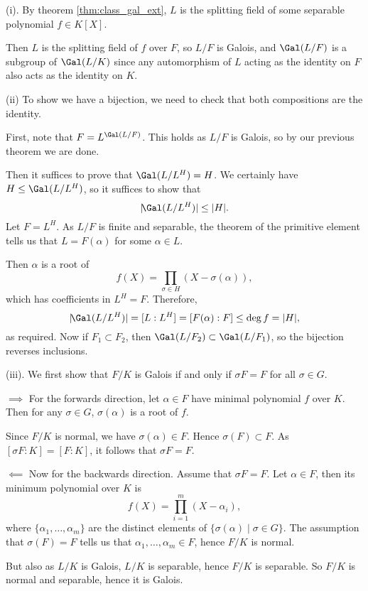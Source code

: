 \documentclass[12pt]{article}
\begin{document}
\begin{proofbox}
	(i). By theorem \ref{thm:class_gal_ext}, $L$ is the splitting field of some separable polynomial $f \in K[X]$.

	Then $L$ is the splitting field of $f$ over $F$, so $L/F$ is Galois, and $\Gal(L/F)$ is a subgroup of $\Gal(L/K)$ since any automorphism of $L$ acting as the identity on $F$ also acts as the identity on $K$.

	(ii) To show we have a bijection, we need to check that both compositions are the identity.

	First, note that $F = L^{\Gal(L/F)}$. This holds as $L/F$ is Galois, so by our previous theorem we are done.

	Then it suffices to prove that $\Gal(L/L^H) = H$. We certainly have $H \le \Gal(L/L^H)$, so it suffices to show that
	\[
	|\!\Gal(L/L^H)| \leq |H|.
	\]
	Let $F = L^H$. As $L/F$ is finite and separable, the theorem of the primitive element tells us that $L = F(\alpha)$ for some $\alpha \in L$.

	Then $\alpha$ is a root of
	\[
	f(X) = \prod_{\sigma \in H} (X - \sigma(\alpha)),
	\]
	which has coefficients in $L^H = F$. Therefore,
	\[
		|\!\Gal(L/L^H)| = [L:L^H] = [F(\alpha):F] \leq \deg f = |H|,
	\]
	as required. Now if $F_1 \subset F_2$, then $\Gal(L/F_2) \subset \Gal(L/F_1)$, so the bijection reverses inclusions.

	(iii). We first show that $F/K$ is Galois if and only if $\sigma F = F$ for all $\sigma \in G$.

	$\implies$ For the forwards direction, let $\alpha \in F$ have minimal polynomial $f$ over $K$. Then for any $\sigma \in G$, $\sigma(\alpha)$ is a root of $f$.

	Since $F/K$ is normal, we have $\sigma(\alpha) \in F$. Hence $\sigma(F) \subset F$. As $[\sigma F : K] = [F : K]$, it follows that $\sigma F = F$.

	$\impliedby$ Now for the backwards direction. Assume that $\sigma F = F$. Let $\alpha \in F$, then its minimum polynomial over $K$ is
	\[
	f(X) = \prod_{i = 1}^{m} (X - \alpha_i),
	\]
	where $\{\alpha_1, \ldots, \alpha_m\}$ are the distinct elements of $\{\sigma(\alpha) \mid \sigma \in G\}$. The assumption that $\sigma(F) = F$ tells us that $\alpha_1, \ldots, \alpha_m \in F$, hence $F/K$ is normal.

	But also as $L/K$ is Galois, $L/K$ is separable, hence $F/K$ is separable. So $F/K$ is normal and separable, hence it is Galois.


\end{proofbox}
\end{document}
